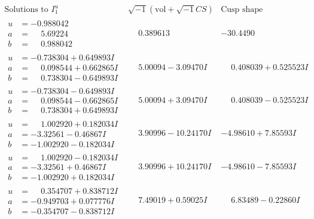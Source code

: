 \documentclass[1p]{elsarticle_modified}
\theoremstyle{definition}
\newcommand{\I}{\sqrt{-1}}
\begin{document}
$$\begin{array}{c|c|c}  
\text{Solutions to }I^u_{1}& \I (\text{vol} + \sqrt{-1}CS) & \text{Cusp shape}\\
 \hline 
\begin{aligned}
u &= -0.988042\phantom{ +0.000000I} \\
a &= \phantom{-}5.69224\phantom{ +0.000000I} \\
b &= \phantom{-}0.988042\phantom{ +0.000000I}\end{aligned}
 & \phantom{-}0.389613\phantom{ +0.000000I} & -30.4490\phantom{ +0.000000I} \\ \hline\begin{aligned}
u &= -0.738304 + 0.649893 I \\
a &= \phantom{-}0.098544 + 0.662865 I \\
b &= \phantom{-}0.738304 - 0.649893 I\end{aligned}
 & \phantom{-}5.00094 - 3.09470 I & \phantom{-}0.408039 + 0.525523 I \\ \hline\begin{aligned}
u &= -0.738304 - 0.649893 I \\
a &= \phantom{-}0.098544 - 0.662865 I \\
b &= \phantom{-}0.738304 + 0.649893 I\end{aligned}
 & \phantom{-}5.00094 + 3.09470 I & \phantom{-}0.408039 - 0.525523 I \\ \hline\begin{aligned}
u &= \phantom{-}1.002920 + 0.182034 I \\
a &= -3.32561 - 0.46867 I \\
b &= -1.002920 - 0.182034 I\end{aligned}
 & \phantom{-}3.90996 - 10.24170 I & -4.98610 + 7.85593 I \\ \hline\begin{aligned}
u &= \phantom{-}1.002920 - 0.182034 I \\
a &= -3.32561 + 0.46867 I \\
b &= -1.002920 + 0.182034 I\end{aligned}
 & \phantom{-}3.90996 + 10.24170 I & -4.98610 - 7.85593 I \\ \hline\begin{aligned}
u &= \phantom{-}0.354707 + 0.838712 I \\
a &= -0.949703 + 0.077776 I \\
b &= -0.354707 - 0.838712 I\end{aligned}
 & \phantom{-}7.49019 + 0.59025 I & \phantom{-}6.83489 - 0.22860 I \\ \hline\begin{aligned}

\end{aligned}
\end{array}$$
\end{document}
